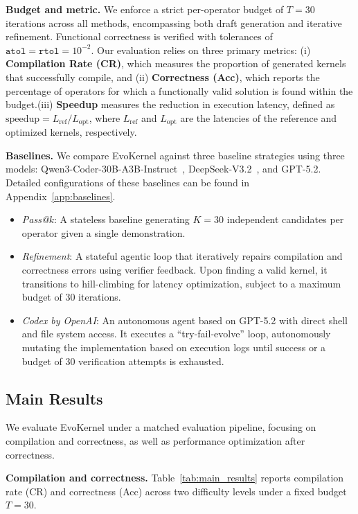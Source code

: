 \documentclass{article} %
\newcommand{\ourmethod}{EvoKernel\xspace}
\theoremstyle{definition}
\theoremstyle{remark}
\begin{document}
\textbf{Budget and metric.}
We enforce a strict per-operator budget of $T=30$ iterations across all methods, encompassing both draft generation and iterative refinement. Functional correctness is verified with tolerances of $\texttt{atol}=\texttt{rtol}=10^{-2}$. Our evaluation relies on three primary metrics: (i) \textbf{Compilation Rate (CR)}, which measures the proportion of generated kernels that successfully compile, and (ii) \textbf{Correctness (Acc)}, which reports the percentage of operators for which a functionally valid solution is found within the budget.(iii) \textbf{Speedup} measures the reduction in execution latency, defined as $\text{speedup} = L_{\text{ref}} / L_{\text{opt}}$, where $L_{\text{ref}}$ and $L_{\text{opt}}$ are the latencies of the reference and optimized kernels, respectively.

\textbf{Baselines.}
We compare \ourmethod against three baseline strategies using three models: Qwen3-Coder-30B-A3B-Instruct~\citep{yang2025qwen3}, DeepSeek-V3.2~\citep{liu2025deepseek}, and GPT-5.2. Detailed configurations of these baselines can be found in Appendix~\ref{app:baselines}.
\begin{itemize}
    \item \emph{Pass@$k$}: A stateless baseline generating $K=30$ independent candidates per operator given a single demonstration.
    \item \emph{Refinement}: A stateful agentic loop that iteratively repairs compilation and correctness errors using verifier feedback. Upon finding a valid kernel, it transitions to hill-climbing for latency optimization, subject to a maximum budget of 30 iterations.
    \item \emph{Codex by OpenAI}: An autonomous agent based on GPT-5.2 with direct shell and file system access. It executes a ``try-fail-evolve'' loop, autonomously mutating the implementation based on execution logs until success or a budget of 30 verification attempts is exhausted.
\end{itemize}

\subsection{Main Results}
\label{sec:main_results}
We evaluate \ourmethod under a matched evaluation pipeline, focusing on compilation and correctness, as well as performance optimization after correctness.

\textbf{Compilation and correctness.}
Table~\ref{tab:main_results} reports compilation rate (CR) and correctness (Acc) across two difficulty levels under a fixed budget $T{=}30$.
\end{document}
